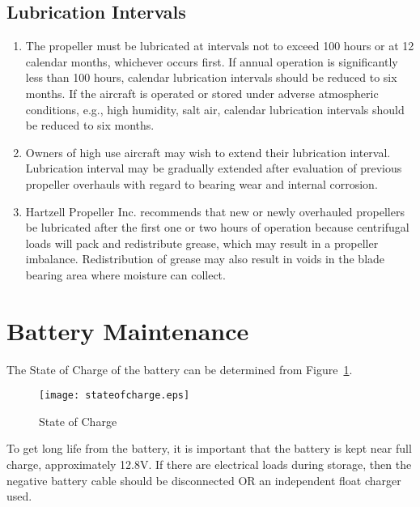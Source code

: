 \subsection{Lubrication Intervals}
\begin{enumerate}
\item 
The propeller must be lubricated at intervals not to 
exceed 100 hours or at 12 calendar months, whichever 
occurs first.
\subitem
If annual operation is significantly less than 100 
hours, calendar lubrication intervals should be 
reduced to six months.
\subitem
If the aircraft is operated or stored under adverse 
atmospheric conditions, e.g., high humidity, salt air, 
calendar lubrication intervals should be reduced to 
six months.
\item
Owners of high use aircraft may wish to extend their 
lubrication interval. Lubrication interval may be gradually 
extended after evaluation of previous propeller overhauls 
with regard to bearing wear and internal corrosion.
\item 
Hartzell Propeller Inc. recommends that new or newly 
overhauled propellers be lubricated after the first one or 
two hours of operation because centrifugal loads will pack 
and redistribute grease, which may result in a propeller 
imbalance. Redistribution of grease may also result in 
voids in the blade bearing area where moisture can collect.
\end{enumerate}

\section{Battery Maintenance}
The State of Charge of the battery can be determined from Figure~\ref{fig:SOC}.

\begin{figure}[H]
\centering
\texttt{[image: stateofcharge.eps]}
\caption{State of Charge}
\label{fig:SOC}
\end{figure}

To get long life from the battery, it is important that the battery is kept near full charge, approximately 12.8V.  If there are electrical loads during storage, then the negative battery cable should be disconnected OR an independent float charger used.
